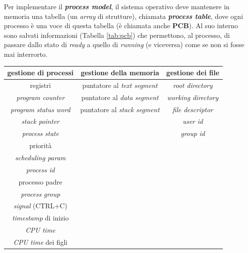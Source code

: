 Per implementare il \textbf{\textit{process model}}, il sistema operativo deve mantenere in memoria una tabella (un \textit{array} di strutture), chiamata \textbf{\textit{process table}}, dove ogni processo è una voce di questa tabella (è chiamata anche \textbf{PCB}). Al suo interno sono salvati informazioni (Tabella \ref{tab:pcb}) che permettono, al processo, di passare dallo stato di \textit{ready} a quello di \textit{running} (e viceversa) come se non si fosse mai interrorto.

\begin{center}
    \begin{tabular}{ | c | c | c | } \hline
        \textbf{gestione di processi} & \textbf{gestione della memoria} & \textbf{gestione dei file} \\ \hline
        registri & puntatore al \textit{text segment} & \textit{root directory} \\ \hline
        \textit{program counter} & puntatore al \textit{data segment} & \textit{working directory} \\ \hline
        \textit{program status word} & puntatore al \textit{stack segment} & \textit{file descriptor} \\ \hline
        \textit{stack pointer} & & \textit{user id} \\ \hline
        \textit{process state} & & \textit{group id} \\ \hline
        priorità & & \\ \hline
        \textit{scheduling param} & & \\ \hline
        \textit{process id} & & \\ \hline
        processo padre & & \\ \hline
        \textit{process group} & & \\ \hline
        \textit{signal} (CTRL+C) & & \\ \hline
        \textit{timestamp} di inizio & & \\ \hline
        \textit{CPU time} & & \\ \hline
        \textit{CPU time} dei figli & & \\ \hline
    \end{tabular}
    \label{tab:pcb}
\end{center}

